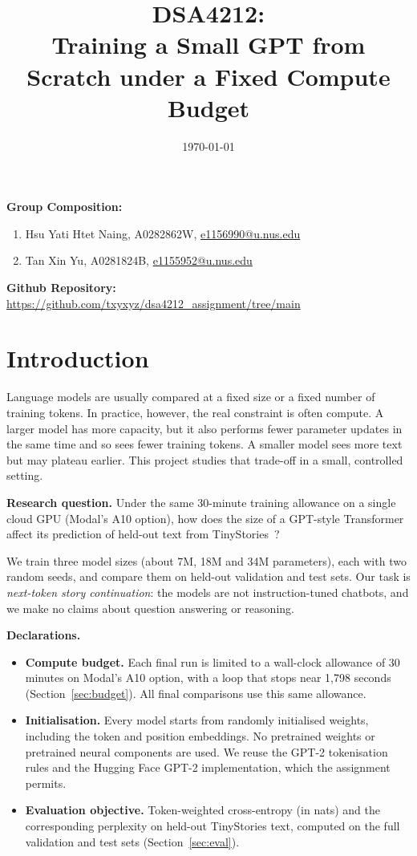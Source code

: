 \documentclass[11pt,a4paper]{article}
\title{DSA4212:\\ Training a Small GPT from Scratch under a Fixed Compute Budget}
\date{\today}
\begin{document}
\maketitle

\noindent\textbf{Group Composition:}
\begin{enumerate}
  \item Hsu Yati Htet Naing, A0282862W, \href{mailto:e1156990@u.nus.edu}{e1156990@u.nus.edu}
  \item Tan Xin Yu, A0281824B, \href{mailto:e1155952@u.nus.edu}{e1155952@u.nus.edu}
\end{enumerate}

\noindent\textbf{Github Repository:} \url{https://github.com/txyxyz/dsa4212_assignment/tree/main}

\section{Introduction}
Language models are usually compared at a fixed size or a fixed number of training tokens. In practice, however, the real constraint is often compute. A larger model has more capacity, but it also performs fewer parameter updates in the same time and so sees fewer training tokens. A smaller model sees more text but may plateau earlier. This project studies that trade-off in a small, controlled setting.

\textbf{Research question.} Under the same 30-minute training allowance on a single cloud GPU (Modal's A10 option), how does the size of a GPT-style Transformer affect its prediction of held-out text from TinyStories~\cite{TS}?

We train three model sizes (about 7M, 18M and 34M parameters), each with two random seeds, and compare them on held-out validation and test sets. Our task is \emph{next-token story continuation}: the models are not instruction-tuned chatbots, and we make no claims about question answering or reasoning.

\textbf{Declarations.}
\begin{itemize}
  \item \textbf{Compute budget.} Each final run is limited to a wall-clock allowance of 30 minutes on Modal's A10 option, with a loop that stops near 1,798 seconds (Section~\ref{sec:budget}). All final comparisons use this same allowance.
  \item \textbf{Initialisation.} Every model starts from randomly initialised weights, including the token and position embeddings. No pretrained weights or pretrained neural components are used. We reuse the GPT-2 tokenisation rules and the Hugging Face GPT-2 implementation, which the assignment permits.
  \item \textbf{Evaluation objective.} Token-weighted cross-entropy (in nats) and the corresponding perplexity on held-out TinyStories text, computed on the full validation and test sets (Section~\ref{sec:eval}).
\end{itemize}
\end{document}
